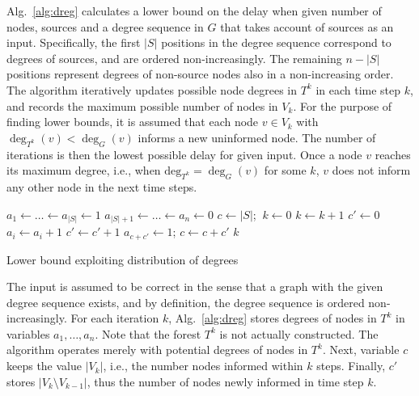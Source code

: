 Alg.~\ref{alg:dreg} calculates a lower bound on the delay when given number of nodes, sources and a degree sequence in $G$ that takes account of sources as an input.
Specifically, the first $|S|$ positions in the degree sequence correspond to degrees of sources, and are ordered non-increasingly.
The remaining $n-|S|$ positions represent degrees of non-source nodes also in a non-increasing order.
The algorithm iteratively updates possible node degrees in $T^k$ in each time step $k$, and records the maximum possible number of nodes in $V_k$.
For the purpose of finding lower bounds, it is assumed that each node $v\in V_k$ with $\deg_{T^k}(v)<\deg_G(v)$ informs a new uninformed node.
The number of iterations is then the lowest possible delay for given input.
Once a node $v$ reaches its maximum degree, i.e., when $\text{deg}_{T^k}=\deg_G(v)$ for some $k$, $v$ does not inform any other node in the next time steps.


\begin{algorithm}
$a_1\leftarrow\dots\leftarrow a_{|S|}\leftarrow 1$\;%
$a_{|S|+1}\leftarrow\dots\leftarrow a_{n}\leftarrow 0$\;%
$c\leftarrow |S|$;%
$~k\leftarrow 0$\;
 {
$k\leftarrow k+1$\;
$c'\leftarrow 0$\;
 {
	 {
		$a_i\leftarrow a_i + 1$\;
		$c'\leftarrow c' + 1$\;
		 {
			$a_{c+c'}\leftarrow 1$; 
		}
	}
}
$c\leftarrow c + c'$\;
}
\Return $k$\;
 \caption{Lower bound exploiting distribution of degrees}
\label{alg:dreg}
\end{algorithm}

The input is assumed to be correct in the sense that a graph with the given degree sequence exists, and by definition, the degree sequence is ordered non-increasingly.
For each iteration $k$, Alg.~\ref{alg:dreg} stores degrees of nodes in $T^k$ in variables $a_1,\dots,a_n$.
Note that the forest $T^k$ is not actually constructed. 
The algorithm operates merely with potential degrees of nodes in $T^k$.
Next, variable $c$ keeps the value $|V_k|$, i.e., the number nodes informed within $k$ steps.
Finally, $c'$ stores $|V_k\setminus V_{k-1}|$, thus the number of nodes newly informed in time step $k$.

